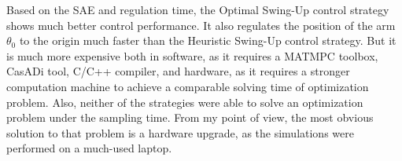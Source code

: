 Based on the SAE and regulation time, the  Optimal Swing-Up control strategy shows much better control performance. It also regulates the position of the arm $\theta_0$ to the origin much faster than the Heuristic Swing-Up control strategy. But it is much more expensive both in software, as it requires a \textsc{MATMPC} toolbox, CasADi tool, C/C++ compiler, and hardware, as it requires a stronger computation machine to achieve a comparable solving time of optimization problem. Also, neither of the strategies were able to solve an optimization problem under the sampling time. From my point of view, the most obvious solution to that problem is a hardware upgrade, as the simulations were performed on a much-used laptop.